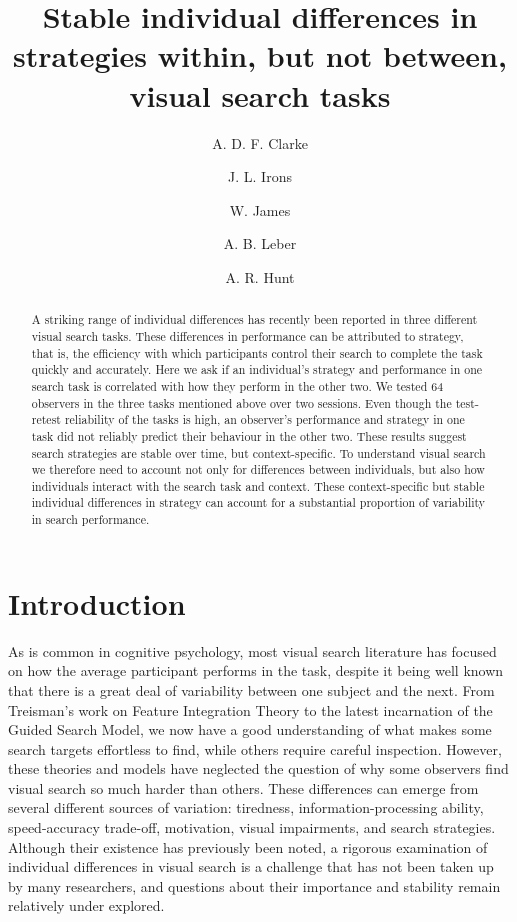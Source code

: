 \documentclass[twocolumn]{article}
\title{Stable individual differences in strategies within, but not between, visual search tasks}
\author[1, *]{A. D. F. Clarke}
\author[2]{J. L. Irons}
\author[3]{W. James}
\author[2]{A. B. Leber}
\author[3]{A. R. Hunt}
\affil[1]{Department of Psychology, University of Essex, Colchester, UK}
\affil[2]{Department of Psychology, The Ohio State University, Columbus, USA}
\affil[3]{School of Psychology, University of Aberdeen, Aberdeen, UK}
\affil[*]{Corresponding author: a.clarke@essex.ac.uk}
\begin{document}
\maketitle

\begin{abstract}
A striking range of individual differences has recently been reported in three different visual search tasks. These differences in performance can be attributed to strategy, that is, the efficiency with which participants control their search to complete the task quickly and accurately. Here we ask if an individual's strategy and performance in one search task is correlated with how they perform in the other two. We tested 64 observers in the three tasks mentioned above over two sessions. Even though the test-retest reliability of the tasks is high, an observer's performance and strategy in one task did not reliably predict their behaviour in the other two. These results suggest search strategies are stable over time, but context-specific. To understand visual search we therefore need to account not only for differences between individuals, but also how individuals interact with the search task and context. These context-specific but stable individual differences in strategy can account for a substantial proportion of variability in search performance.
\end{abstract}


\section{Introduction}

As is common in cognitive psychology, most visual search literature has focused on how the average participant performs in the task, despite it being well known that there is a great deal of variability between one subject and the next. From Treisman's work on Feature Integration Theory\cite{treisman1980} to the latest incarnation of the Guided Search Model\cite{wolfe2015}, we now have a good understanding of what makes some search targets effortless to find, while others require careful inspection. However, these theories and models have neglected the question of why some observers find visual search so much harder than others. These differences can emerge from several different sources of variation: tiredness\cite{mackworth1948}, information-processing ability, speed-accuracy trade-off, motivation, visual impairments\cite{nowakowska2016}, and search strategies\cite{boot2006}. Although their existence has previously been noted\cite{mackworth1948}, a rigorous examination of individual differences in visual search is a challenge that has not been taken up by many researchers, and questions about their importance and stability remain relatively under explored. 
\end{document}
